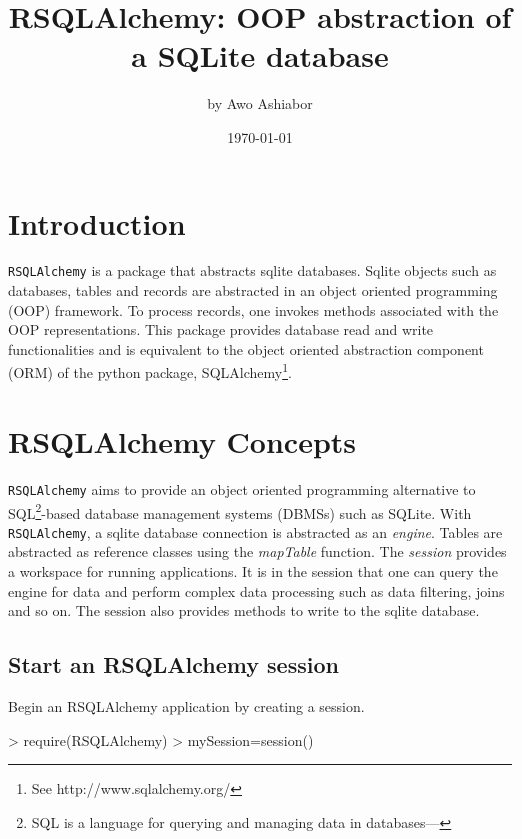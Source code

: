 \documentclass[a4paper,11pt]{article}
\title{RSQLAlchemy: OOP abstraction of a SQLite database}
\author{by Awo Ashiabor}
\date{\today}
\begin{document}

\maketitle

\section{Introduction}
 \texttt{RSQLAlchemy} is a package that abstracts sqlite databases. Sqlite objects such as databases, tables and records are abstracted in an object oriented programming (OOP) framework. To process records, one invokes methods associated with the OOP representations. This package provides database read and write functionalities and is equivalent to the object oriented abstraction component (ORM) of the python package, SQLAlchemy\footnote{See http://www.sqlalchemy.org/}.

\section{RSQLAlchemy Concepts}
 \texttt{RSQLAlchemy}  aims to provide an object oriented programming alternative to SQL\footnote{SQL is a language for querying and managing data in databases---}-based database management  systems (DBMSs) such as SQLite. With \texttt{RSQLAlchemy}, a sqlite database connection is abstracted as an \emph{engine}. Tables are abstracted as reference classes using the \emph{mapTable} function. The \emph{session} provides a workspace for running applications. It is in the session that one can query the engine for data and perform complex data processing such as data filtering, joins and so on. The session also provides methods to write to the sqlite database.

\subsection*{Start an RSQLAlchemy session}
Begin an RSQLAlchemy application by creating a session.
\begin{Schunk}
\begin{Sinput}
> require(RSQLAlchemy)
> mySession=session()
\end{Sinput}
\end{Schunk}
\end{document}
